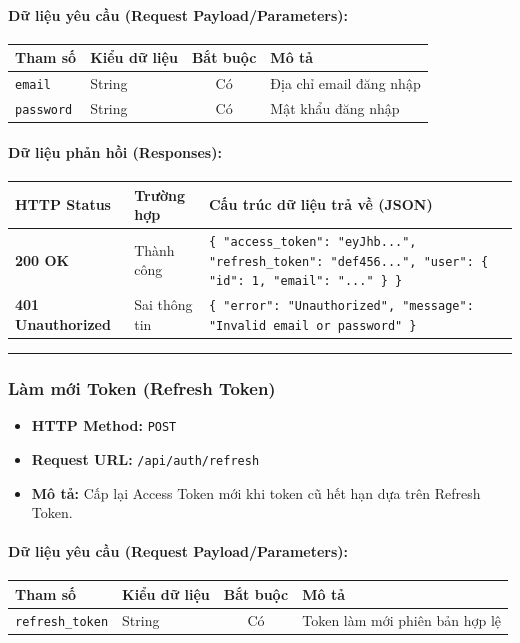 \documentclass[12pt,a4paper]{article}
\begin{document}
\paragraph{Dữ liệu yêu cầu (Request Payload/Parameters):}
\begin{longtable}{|p{2.8cm}|p{2.2cm}|c|p{7.0cm}|}
\hline
\textbf{Tham số} & \textbf{Kiểu dữ liệu} & \textbf{Bắt buộc} & \textbf{Mô tả} \\ \hline
\endhead
\texttt{email} & String & Có & Địa chỉ email đăng nhập \\ \hline
\texttt{password} & String & Có & Mật khẩu đăng nhập \\ \hline
\end{longtable}

\paragraph{Dữ liệu phản hồi (Responses):}
\begin{longtable}{|p{2.8cm}|p{3.2cm}|p{8.0cm}|}
\hline
\textbf{HTTP Status} & \textbf{Trường hợp} & \textbf{Cấu trúc dữ liệu trả về (JSON)} \\ \hline
\endhead
\textbf{200 OK} & Thành công & \texttt{\{ "access\_token": "eyJhb...", "refresh\_token": "def456...", "user": \{ "id": 1, "email": "..." \} \}} \\ \hline
\textbf{401 Unauthorized} & Sai thông tin & \texttt{\{ "error": "Unauthorized", "message": "Invalid email or password" \}} \\ \hline
\end{longtable}

\vskip 0.4cm
\noindent\rule{\textwidth}{0.3pt}
\vskip 0.4cm

\subsubsection{Làm mới Token (Refresh Token)}
\begin{itemize}[leftmargin=*]
    \item \textbf{HTTP Method:} \texttt{POST}
    \item \textbf{Request URL:} \texttt{/api/auth/refresh}
    \item \textbf{Mô tả:} Cấp lại Access Token mới khi token cũ hết hạn dựa trên Refresh Token.
\end{itemize}

\paragraph{Dữ liệu yêu cầu (Request Payload/Parameters):}
\begin{longtable}{|p{2.8cm}|p{2.2cm}|c|p{7.0cm}|}
\hline
\textbf{Tham số} & \textbf{Kiểu dữ liệu} & \textbf{Bắt buộc} & \textbf{Mô tả} \\ \hline
\endhead
\texttt{refresh\_token} & String & Có & Token làm mới phiên bản hợp lệ \\ \hline
\end{longtable}
\end{document}
